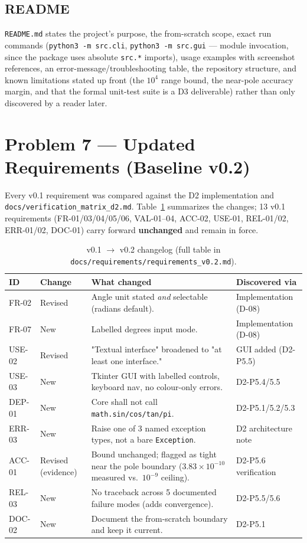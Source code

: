 \documentclass[11pt]{article}
\begin{document}
\subsection{README}

\texttt{README.md} states the project's purpose, the from-scratch scope, exact run commands (\texttt{python3 -m src.cli}, \texttt{python3 -m src.gui} --- module invocation, since the package uses absolute \texttt{src.*} imports), usage examples with screenshot references, an error-message/troubleshooting table, the repository structure, and known limitations stated up front (the $10^4$ range bound, the near-pole accuracy margin, and that the formal unit-test suite is a D3 deliverable) rather than only discovered by a reader later.

\section{Problem 7 --- Updated Requirements (Baseline v0.2)}

Every v0.1 requirement was compared against the D2 implementation and \texttt{docs/verification\_matrix\_d2.md}. Table~\ref{tab:changelog} summarizes the changes; 13 v0.1 requirements (FR-01/03/04/05/06, VAL-01--04, ACC-02, USE-01, REL-01/02, ERR-01/02, DOC-01) carry forward \textbf{unchanged} and remain in force.

\begin{table}[htbp]
\centering
\footnotesize
\begin{tabular}{p{1.3cm}p{2cm}p{6.5cm}p{3.5cm}}
\toprule
\textbf{ID} & \textbf{Change} & \textbf{What changed} & \textbf{Discovered via} \\
\midrule
FR-02 & Revised & Angle unit stated \emph{and} selectable (radians default). & Implementation (D-08) \\
FR-07 & New & Labelled degrees input mode. & Implementation (D-08) \\
USE-02 & Revised & "Textual interface" broadened to "at least one interface." & GUI added (D2-P5.5) \\
USE-03 & New & Tkinter GUI with labelled controls, keyboard nav, no colour-only errors. & D2-P5.4/5.5 \\
DEP-01 & New & Core shall not call \texttt{math.sin/cos/tan/pi}. & D2-P5.1/5.2/5.3 \\
ERR-03 & New & Raise one of 3 named exception types, not a bare \texttt{Exception}. & D2 architecture note \\
ACC-01 & Revised (evidence) & Bound unchanged; flagged as tight near the pole boundary ($3.83\times10^{-10}$ measured vs.\ $10^{-9}$ ceiling). & D2-P5.6 verification \\
REL-03 & New & No traceback across 5 documented failure modes (adds convergence). & D2-P5.5/5.6 \\
DOC-02 & New & Document the from-scratch boundary and keep it current. & D2-P5.1 \\
\bottomrule
\end{tabular}
\caption{v0.1 $\to$ v0.2 changelog (full table in \texttt{docs/requirements/requirements\_v0.2.md}).}
\label{tab:changelog}
\end{table}
\end{document}
